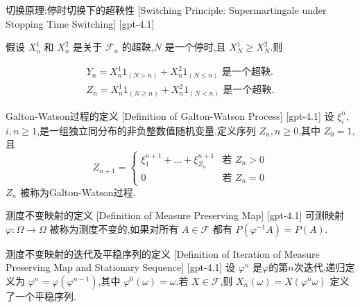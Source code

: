 \documentclass[UTF8]{ctexart}
\begin{document}
    \begin{thm}
        {切换原理:停时切换下的超鞅性}
        [Switching Principle: Supermartingale under Stopping Time Switching]
        [gpt-4.1]
        
假设 $X_{n}^{1}$ 和 $X_{n}^{2}$ 是关于 ${\mathcal{F}}_{n}$ 的超鞅,$N$ 是一个停时,且 $X_{N}^{1} \ge X_{N}^{2}$.则

\[
\begin{array}{r}
Y_{n} = X_{n}^{1} 1_{(N > n)} + X_{n}^{2} 1_{(N \leq n)} \text{ 是一个超鞅.} \\
Z_{n} = X_{n}^{1} 1_{(N \geq n)} + X_{n}^{2} 1_{(N < n)} \text{ 是一个超鞅.}
\end{array}
\]

    \end{thm}
    
    
    
    \begin{dfn}
        {Galton-Watson过程的定义}
        [Definition of Galton-Watson Process]
        [gpt-4.1]
        设 $\xi _ { i } ^ { n }$, $i, n \geq 1$,是一组独立同分布的非负整数值随机变量.定义序列 $Z _ { n }, n \geq 0$,其中 $Z _ { 0 } = 1$,且
\[
Z _ { n + 1 } = \begin{cases}
\xi _ { 1 } ^ { n + 1 } + \dots + \xi _ { Z _ { n } } ^ { n + 1 } & \text{若 } Z _ { n } > 0 \\
0 & \text{若 } Z _ { n } = 0
\end{cases}
\]
$Z _ { n }$ 被称为Galton-Watson过程.

    \end{dfn}
    
    
    
    \begin{dfn}
        {测度不变映射的定义}
        [Definition of Measure Preserving Map]
        [gpt-4.1]
        可测映射 $\varphi: \Omega \to \Omega$ 被称为测度不变的,如果对所有 $A \in \mathcal{F}$ 都有 $P(\varphi^{-1}A) = P(A)$.
    \end{dfn}
    
    
    
    \begin{dfn}
        {测度不变映射的迭代及平稳序列的定义}
        [Definition of Iteration of Measure Preserving Map and Stationary Sequence]
        [gpt-4.1]
        设 $\varphi^n$ 是$\varphi$的第$n$次迭代,递归定义为 $\varphi^n = \varphi(\varphi^{n-1})$,其中 $\varphi^0(\omega) = \omega$.若 $X \in \mathcal{F}$,则 $X_n(\omega) = X(\varphi^n \omega)$ 定义了一个平稳序列.
    \end{dfn}
    
\end{document}
